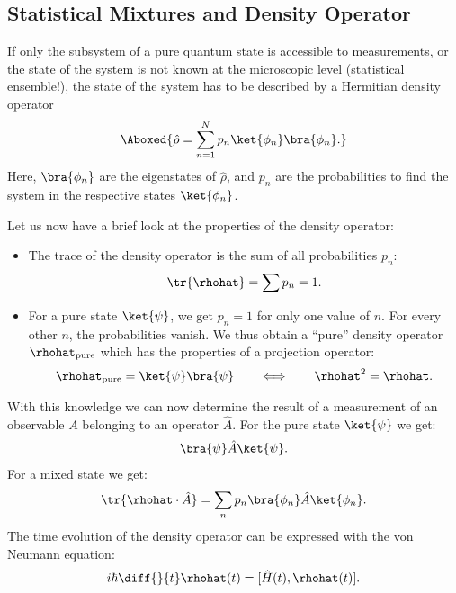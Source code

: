 		\subsection{Statistical Mixtures and Density Operator}

			If only the subsystem of a pure quantum state is accessible to measurements, or the state of the system is not known at the microscopic level (statistical ensemble!), the state of the system has to be described by a Hermitian density operator
			\begin{align}
				\Aboxed{\hat{\rho} = \sum_{n=1}^N p_n \ket{\phi_n}\bra{\phi_n}.}
			\end{align}
			Here, $\bra{\phi_n}$ are the eigenstates of $\hat{\rho}$, and $p_n$ are the probabilities to find the system in the respective states $\ket{\phi_n}$.

			Let us now have a brief look at the properties of the density operator:
			\begin{itemize}
				\item The trace of the density operator is the sum of all probabilities $p_n$:
				\begin{align}
					\tr{\rhohat} = \sum p_n = 1.
				\end{align}
				\item For a pure state $\ket{\psi}$, we get $p_n=1$ for only one value of $n$. For every other $n$, the probabilities vanish. We thus obtain a ``pure'' density operator $\rhohat_{\text{pure}}$ which has the properties of a projection operator:
				\begin{align}
					\rhohat_{\text{pure}} = \ket{\psi}\bra{\psi} \qquad \Longleftrightarrow \qquad \rhohat^2 = \rhohat.
				\end{align}
			\end{itemize}
			With this knowledge we can now determine the result of a measurement of an observable $A$ belonging to an operator $\hat{A}$. For the pure state $\ket{\psi}$ we get:
%
			\begin{align}
				\bra{\psi} \hat{A} \ket{\psi}.
			\end{align}
			For a mixed state we get:
			\begin{align}
				\tr{\rhohat \cdot \hat{A}} = \sum_n {p_n} \bra{\phi_n} \hat{A} \ket{\phi_n}.
			\end{align}
			The time evolution of the density operator can be expressed with the von Neumann equation:
			\begin{align}
				i\hbar \diff{}{t}\rhohat(t) = [\hat{H}(t),\rhohat(t)].
			\end{align}
